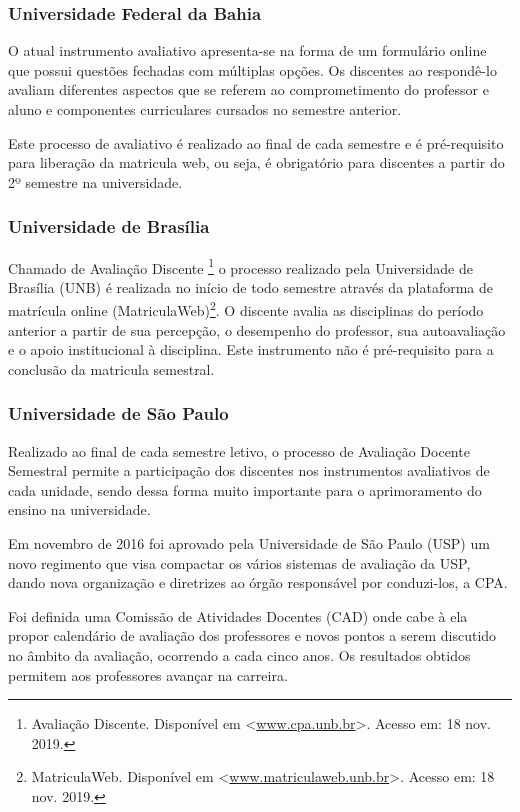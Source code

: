 \documentclass[12pt, a4paper]{report}
\begin{document}
 \subsubsection{Universidade Federal da Bahia}
 O atual instrumento avaliativo apresenta-se na forma de um formulário online que possui questões fechadas com múltiplas opções. Os discentes ao respondê-lo avaliam diferentes aspectos que se referem ao comprometimento do professor e aluno e componentes curriculares cursados no semestre anterior.
 
 Este processo de avaliativo é realizado ao final de cada semestre e é pré-requisito para liberação da matricula web, ou seja, é obrigatório para discentes a partir do 2º semestre na universidade.
 
\subsubsection{Universidade de Brasília}
Chamado de Avaliação Discente \footnote{Avaliação Discente. Disponível em <\url{www.cpa.unb.br}>. Acesso em: 18 nov. 2019.} o processo realizado pela Universidade de Brasília (UNB) é realizada no início de todo semestre através da plataforma de matrícula online (MatriculaWeb)\footnote{MatriculaWeb. Disponível em <\url{www.matriculaweb.unb.br}>. Acesso em: 18 nov. 2019.}. O discente avalia as disciplinas do período anterior a partir de sua percepção, o desempenho do professor, sua autoavaliação e o apoio institucional à disciplina. Este instrumento não é pré-requisito para a conclusão da matricula semestral.
 
\subsubsection{Universidade de São Paulo}

Realizado ao final de cada semestre letivo, o processo de Avaliação Docente Semestral permite a participação dos discentes nos instrumentos avaliativos de cada unidade, sendo dessa forma muito importante para o aprimoramento do ensino na universidade.

Em novembro de 2016 foi aprovado pela Universidade de São Paulo (USP) um novo regimento que visa compactar os vários sistemas de avaliação da USP, dando nova organização e diretrizes ao órgão responsável por conduzi-los, a CPA.

Foi definida uma Comissão de Atividades Docentes (CAD) onde cabe à ela propor calendário de avaliação dos professores e novos pontos a serem discutido no âmbito da avaliação, ocorrendo a cada cinco anos. Os resultados obtidos permitem aos professores avançar na carreira.
\end{document}
